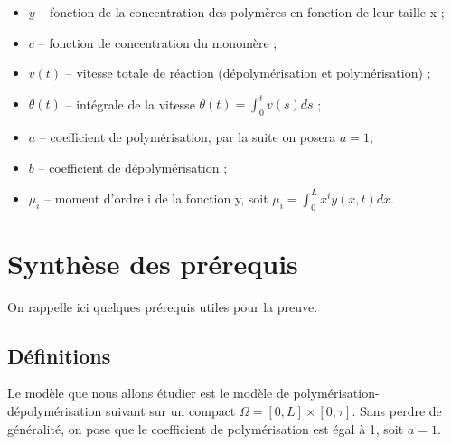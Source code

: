 \documentclass[a4paper]{article}
\newcommand{\pol}{a}
\newcommand{\dep}{b}
\begin{document}
\begin{itemize}
\item $y$ -- fonction de la concentration des polymères en fonction de leur taille x ;
\item $c$ -- fonction de concentration du monomère ;
\item $v(t)$ -- vitesse totale de réaction (dépolymérisation et polymérisation) ;
\item $\theta(t)$ -- intégrale de la vitesse $\theta(t)=\int_0^t v(s)ds$ ;
\item $\pol$ -- coefficient de polymérisation, par la suite on posera $\pol=1$;
\item $\dep$ -- coefficient de dépolymérisation ;
\item $\mu_i$ -- moment d'ordre i de la fonction y, soit $\mu_i = \int_0^L x^i y(x,t)dx$.
\end{itemize}



\section{Synthèse des prérequis}

On rappelle ici quelques prérequis utiles pour la preuve.

\subsection{Définitions}

Le modèle que nous allons étudier est le modèle de polymérisation-dépolymérisation suivant 
sur un compact $\Omega = [0,L] \times [0,\tau]$. 
Sans perdre de généralité, 
on pose que le coefficient de polymérisation est égal à 1, 
soit $\pol =1$.
\end{document}
